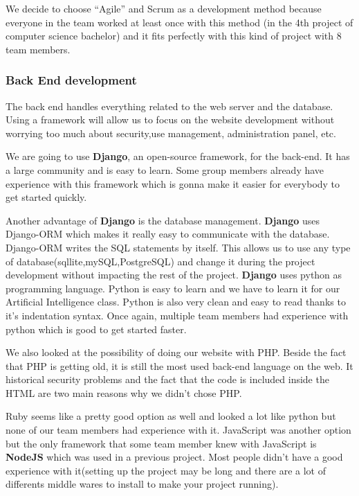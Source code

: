 We decide to choose \enquote{Agile} and Scrum as a development method because
everyone in the team worked at least once with this method (in the 4th
project of computer science bachelor) and it fits perfectly with this
kind of project with 8 team members.\newline

\subsubsection{Back End development}
The back end handles everything related to the web server and the database. Using a framework will allow us to focus on the website development without worrying too much about security,use management, administration panel, etc.\newline

We are going to use \textbf{Django}, an open-source framework, for the back-end. It has a large community and is easy to learn. Some group members already have experience with this framework which is gonna make it easier for everybody to get started quickly.\newline

Another advantage of \textbf{Django} is the database management. \textbf{Django} uses Django-ORM which makes it really easy to communicate with the database. Django-ORM writes the SQL statements by itself. This allows us to use any type of database(sqllite,mySQL,PostgreSQL) and change it during the project development without impacting the rest of the project.
\textbf{Django} uses python as programming language. Python is easy to learn and we have to learn it for our Artificial Intelligence class.
Python is also very clean and easy to read thanks to it's indentation syntax. Once again, multiple team members had experience with python which is good to get started faster.\newline

We also looked at the possibility of doing our website with PHP. Beside the fact that PHP is getting old, it is still the most used back-end language on the web. It historical security problems and the fact that the code is included inside the HTML are two main reasons why we didn't chose PHP.\newline

Ruby seems like a pretty good option as well and looked a lot like python but none of our team members had experience with it. JavaScript was another option but the only framework that some team member knew with JavaScript is \textbf{NodeJS} which was used in a previous project. Most people didn't have a good experience with it(setting up the project may be long and there are a lot of differents middle wares to install to make your project running).

